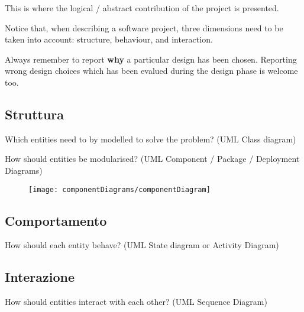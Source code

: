 This is where the logical / abstract contribution of the project is presented.

Notice that, when describing a software project, three dimensions need to be taken into account: structure, behaviour, and interaction.

Always remember to report \textbf{why} a particular design has been chosen.
Reporting wrong design choices which has been evalued during the design phase is welcome too.

\subsection{Struttura}

Which entities need to by modelled to solve the problem?
%
(UML Class diagram)


How should entities be modularised?
%
(UML Component / Package / Deployment Diagrams)

\begin{figure}[H]
  \centering
  \texttt{[image: componentDiagrams/componentDiagram]}
  \caption[componentDiagramCaption]{}
  
  \label{fig:figure30}
\end{figure}

\subsection{Comportamento}

How should each entity behave?
%
(UML State diagram or Activity Diagram)

\subsection{Interazione}

How should entities interact with each other?
%
(UML Sequence Diagram)

